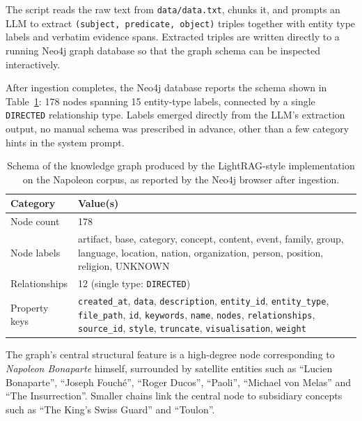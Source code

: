 \documentclass[12pt,a4paper,oneside]{report}
\begin{document}
The script reads the raw text from \texttt{data/data.txt}, chunks it,
and prompts an LLM to extract \texttt{(subject, predicate, object)}
triples together with entity type labels and verbatim evidence spans.
Extracted triples are written directly to a running Neo4j graph
database so that the graph schema can be inspected interactively.

After ingestion completes, the Neo4j database reports the schema shown
in Table~\ref{tab:neo4j_schema}: 178 nodes spanning 15 entity-type
labels, connected by a single \texttt{DIRECTED} relationship type.
Labels emerged directly from the LLM's extraction output, no manual
schema was prescribed in advance, other than a few category hints in
the system prompt.

\begin{table}[htbp]
\centering
\caption{Schema of the knowledge graph produced by the LightRAG-style
implementation on the Napoleon corpus, as reported by the Neo4j browser
after ingestion.}
\label{tab:neo4j_schema}
\small
\begin{tabularx}{\textwidth}{@{}lX@{}}
\toprule
\textbf{Category} & \textbf{Value(s)} \\
\midrule
Node count        & 178 \\
Node labels       & artifact, base, category, concept, content, event,
                    family, group, language, location, nation,
                    organization, person, position, religion, UNKNOWN \\
Relationships     & 12 (single type: \texttt{DIRECTED}) \\
Property keys     & \texttt{created\_at}, \texttt{data},
                    \texttt{description}, \texttt{entity\_id},
                    \texttt{entity\_type}, \texttt{file\_path},
                    \texttt{id}, \texttt{keywords}, \texttt{name},
                    \texttt{nodes}, \texttt{relationships},
                    \texttt{source\_id}, \texttt{style},
                    \texttt{truncate}, \texttt{visualisation},
                    \texttt{weight} \\
\bottomrule
\end{tabularx}
\end{table}

The graph's central structural feature is a high-degree node
corresponding to \emph{Napoleon Bonaparte} himself, surrounded by
satellite entities such as ``Lucien Bonaparte'', ``Joseph Fouché'',
``Roger Ducos'', ``Paoli'', ``Michael von Melas'' and ``The Insurrection''.
Smaller chains link the central node to subsidiary concepts such as
``The King's Swiss Guard'' and ``Toulon''.
\end{document}
